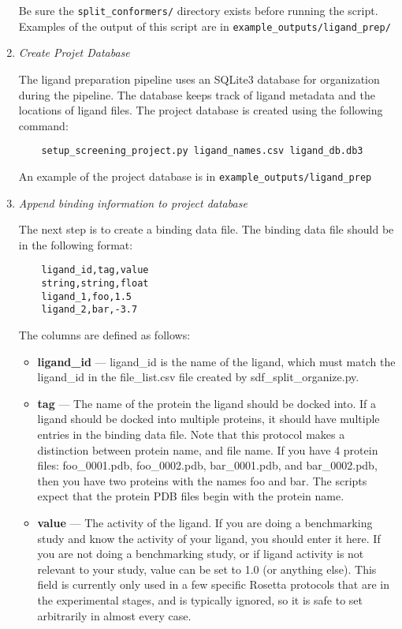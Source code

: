 \begin{enumerate}
	Be sure the \texttt{split\_conformers/} directory exists before running the script.
	Examples of the output of this script are in \texttt{example\_outputs/ligand\_prep/}
\item
	\emph{Create Projet Database}

	The ligand preparation pipeline uses an SQLite3 database for organization during the pipeline.
	The database keeps track of ligand metadata and the locations of ligand files.
	The project database is created using the following command:

	\begin{verbatim}
	setup_screening_project.py ligand_names.csv ligand_db.db3
	\end{verbatim}

  	An example of the project database is in \texttt{example\_outputs/ligand\_prep}
\item
	\emph{Append binding information to project database}

	The next step is to create a binding data file. The binding data file should be in the following format:

	\begin{verbatim}
	ligand_id,tag,value
	string,string,float
	ligand_1,foo,1.5
	ligand_2,bar,-3.7
	\end{verbatim}

	The columns are defined as follows:

	\begin{itemize}
	\itemsep1pt\parskip0pt
	\item
		\textbf{ligand\_id} --- ligand\_id is the name of the ligand, which must match the ligand\_id in the file\_list.csv file created by sdf\_split\_organize.py.
	\item
 		\textbf{tag} --- The name of the protein the ligand should be docked into.
		If a ligand should be docked into multiple proteins, it should have multiple entries in the binding data file.
		Note that this protocol makes a distinction between protein name, and file name.
		If you have 4 protein files: foo\_0001.pdb, foo\_0002.pdb, bar\_0001.pdb, and bar\_0002.pdb, then you have two proteins with the names foo and bar.
		The scripts expect that the protein \ac{PDB} files begin with the protein name.
	\item
		\textbf{value} --- The activity of the ligand. If you are doing a benchmarking study and know the activity of your ligand, you should enter it here.
		If you are not doing a benchmarking study, or if ligand activity is not relevant to your study, value can be set to 1.0 (or anything else). 
		This field is currently only used in a few specific Rosetta protocols that are in the experimental stages, and is  typically ignored, so it is safe to set arbitrarily in almost every  case.
	\end{itemize}


\end{enumerate}
